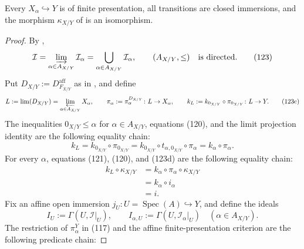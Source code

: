 \begin{lemma}
  \label{lemma:nagata-closed-subscheme-fp-system}
  \lean{}

  Every $X_\alpha\hookrightarrow Y$ is of finite presentation, all
  transitions are closed immersions, and the morphism
  $\kappa_{X/Y}$ of  is an
  isomorphism.
\end{lemma}

\begin{proof}
  By \cite[\href{https://stacks.math.columbia.edu/tag/09ZP}{Tag 09ZP}]
  {stacks-project},
  \[
    \mathcal I=\varinjlim_{\alpha\in A_{X/Y}}\mathcal I_\alpha
      =\bigcup_{\alpha\in A_{X/Y}}\mathcal I_\alpha,
    \qquad
    (A_{X/Y},\leq)\quad\text{is directed}.                     \tag{123}
  \]
  Put $D_{X/Y}:=D_{F_{X/Y}}^{\mathrm{aff}}$ as in
  , and define
  \[
    L:=\lim(D_{X/Y})=\varprojlim_{\alpha\in A_{X/Y}}X_\alpha,\qquad
    \pi_\alpha:=\pi_\alpha^{D_{X/Y}}\colon L\to X_\alpha,\qquad
    k_L:=k_{0_{X/Y}}\circ\pi_{0_{X/Y}}\colon L\to Y.             \tag{123c}
  \]
  The inequalities $0_{X/Y}\leq\alpha$ for
  $\alpha\in A_{X/Y}$, equations (120), and the limit projection identity
  are the following equality chain:
  \[
    k_L
      =k_{0_{X/Y}}\circ\pi_{0_{X/Y}}
      =k_{0_{X/Y}}\circ t_{\alpha,0_{X/Y}}\circ\pi_\alpha
      =k_\alpha\circ\pi_\alpha.                                  \tag{123d}
  \]
  For every $\alpha$, equations (121), (120), and (123d) are the following
  equality chain:
  \[
  \begin{aligned}
    k_L\circ\kappa_{X/Y}
      &=k_\alpha\circ\pi_\alpha\circ\kappa_{X/Y}\\
      &=k_\alpha\circ i_\alpha\\
      &=i.
  \end{aligned}                                                   \tag{123e}
  \]
  Fix an affine open immersion $j_U\colon U=\operatorname{Spec}(A)\hookrightarrow
  Y$, and define the ideals
  \[
    I_U:=\Gamma(U,\mathcal I|_U),
    \qquad
    I_{\alpha,U}:=\Gamma(U,\mathcal I_\alpha|_U)
      \quad(\alpha\in A_{X/Y}).                                  \tag{123a}
  \]
  The restriction of $\pi_\alpha^Y$ in (117) and the affine
  finite-presentation criterion are the following predicate chain:

\end{proof}
